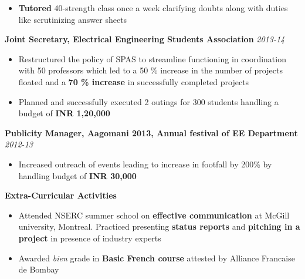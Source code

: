\documentclass[a4paper,10pt]{article}
\newcommand{\resheading}[1]{
	{\large \colorbox{mygrey}{\begin{minipage}{\textwidth}{\textbf{#1 \vphantom{p\^{E}}}}\end{minipage}}}
}
\newcommand{\ressubheadingother}[2]{
	\textbf{#1} \hfill \textit{#2}\null
	\vspace{-3pt}
}
\begin{document}
			\begin{itemize}\itemsep -2pt
				\item \textbf{Tutored} 40-strength class once a week clarifying doubts along with duties like scrutinizing answer sheets
			\end{itemize}
			
			\ressubheadingother{Joint Secretary, Electrical Engineering Students Association}{2013-14}
			\begin{itemize}\itemsep -1pt
				\item Restructured the policy of SPAS to streamline functioning in coordination with 50 professors which led to a 50 \% increase in the number of projects floated and a \textbf{70 \% increase} in successfully completed projects
				\item Planned and successfully executed 2 outings for 300 students handling a budget of \textbf{INR 1,20,000} 
			\end{itemize}
			
			\ressubheadingother{Publicity Manager, Aagomani 2013, Annual festival of EE Department}{2012-13}
			\begin{itemize}\itemsep -1pt
				\item Increased outreach of events leading to increase in footfall by 200\% by handling budget of \textbf{INR 30,000}  			
			\end{itemize}

\resheading{Extra-Curricular Activities}
	\begin{itemize}[label={--}]\itemsep -2pt
		\item Attended NSERC summer school on \textbf{effective communication} at McGill university, Montreal. Practiced presenting \textbf{status reports} and \textbf{pitching in a project} in presence of industry experts
		\item Awarded \textit{bien} grade in \textbf{Basic French course} attested by Alliance Francaise de Bombay
    		\end{itemize}
\end{document}
